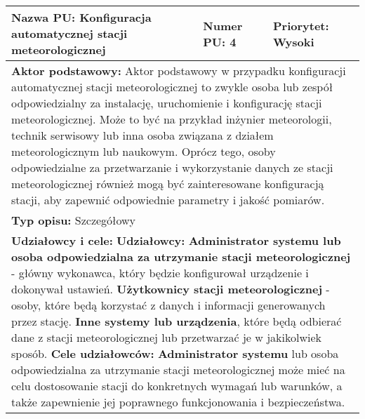 \documentclass{article}
\begin{document}
\begin{center}
    \begin{center}
        \begin{tabular}{|l|l|l|}
        \hline
        \textbf{Nazwa PU:} Konfiguracja automatycznej stacji meteorologicznej & \textbf{Numer PU:} 4 & \textbf{Priorytet:} Wysoki \\
        \hline
        \hline
        \multicolumn{3}{|p{\dimexpr\linewidth-2\tabcolsep-2\arrayrulewidth}|}{\textbf{Aktor podstawowy:}
        \newline 
        Aktor podstawowy w przypadku konfiguracji automatycznej stacji meteorologicznej to zwykle osoba
        lub zespół odpowiedzialny za instalację, uruchomienie i konfigurację stacji meteorologicznej.
        Może to być na przykład inżynier meteorologii, technik serwisowy lub inna osoba związana z działem
        meteorologicznym lub naukowym. Oprócz tego, osoby odpowiedzialne za przetwarzanie i wykorzystanie
        danych ze stacji meteorologicznej również mogą być zainteresowane konfiguracją stacji,
        aby zapewnić odpowiednie parametry i jakość pomiarów.} \\
        \hline
        \hline
        \multicolumn{3}{|p{\dimexpr\linewidth-2\tabcolsep-2\arrayrulewidth}|}{\textbf{Typ opisu:} Szczegółowy} \\
        \hline
        \hline
        \multicolumn{3}{|p{\dimexpr\linewidth-2\tabcolsep-2\arrayrulewidth}|}{\textbf{Udziałowcy i cele:}
        \newline
        \textbf{Udziałowcy:} 
        \newline
        \textbf{Administrator systemu lub osoba odpowiedzialna za utrzymanie stacji meteorologicznej} - główny wykonawca, który będzie konfigurował urządzenie i dokonywał ustawień.
        \newline
        \textbf{Użytkownicy stacji meteorologicznej} - osoby, które będą korzystać z danych i informacji generowanych przez stację.
        \newline
        \textbf{Inne systemy lub urządzenia}, które będą odbierać dane z stacji meteorologicznej lub przetwarzać je w jakikolwiek sposób.
        \newline 
        \textbf{Cele udziałowców:}
        \newline
        \textbf{Administrator systemu} lub osoba odpowiedzialna za utrzymanie stacji meteorologicznej może mieć na celu dostosowanie stacji do konkretnych wymagań lub warunków, a także zapewnienie jej poprawnego funkcjonowania i bezpieczeństwa.
        \newline
}
\end{tabular}
\end{center}
\end{center}
\end{document}
